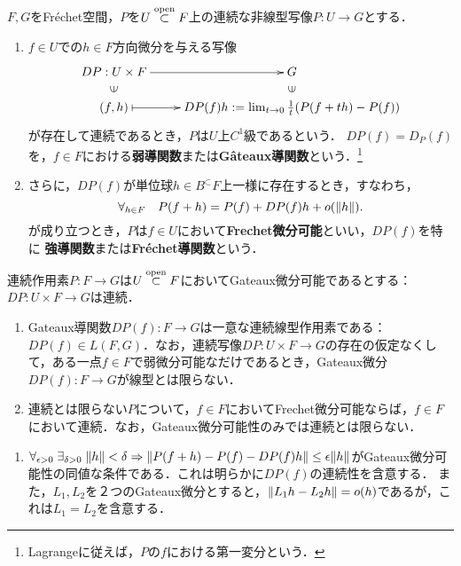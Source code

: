 \documentclass[uplatex,dvipdfmx]{jsreport}
\begin{document}
\begin{definition}
    $F,G$をFréchet空間，$P$を$U\overset{\mathrm{open}}{\subset} F$上の連続な非線型写像$P:U\to G$とする．
    \begin{enumerate}
        \item 
    $f\in U$での$h\in F$方向微分を与える写像
    \[\xymatrix@R-2pc{
        DP:U\times F\ar[r]&G\\
        \rotatebox[origin=c]{90}{$\in$}&\rotatebox[origin=c]{90}{$\in$}\\
        (f,h)\ar@{|->}[r]&DP(f)h:=\lim_{t\to0}\frac{1}{t}(P(f+th)-P(f))
    }\]
    が存在して連続であるとき，$P$は$U$上$C^1$級であるという．
    $DP(f)=D_P(f)$を，$f\in F$における\textbf{弱導関数}または\textbf{Gâteaux導関数}という．\footnote{Lagrangeに従えば，$P$の$f$における第一変分という．}
    \item さらに，$DP(f)$が単位球$h\in B^\subset F$上一様に存在するとき，すなわち，
    \[\forall_{h\in F}\quad P(f+h)=P(f)+DP(f)h+o(\|h\|).\]
    が成り立つとき，$P$は$f\in U$において\textbf{Frechet微分可能}といい，$DP(f)$を特に
    \textbf{強導関数}または\textbf{Fréchet導関数}という．
    \end{enumerate}
\end{definition}

\begin{lemma}
    連続作用素$P:F\to G$は$U\overset{\mathrm{open}}{\subset} F$においてGateaux微分可能であるとする：$DP:U\times F\to G$は連続．
    \begin{enumerate}
        \item Gateaux導関数$DP(f):F\to G$は一意な連続線型作用素である：$DP(f)\in L(F,G)$．なお，連続写像$DP:U\times F\to G$の存在の仮定なくして，ある一点$f\in F$で弱微分可能なだけであるとき，Gateaux微分$DP(f):F\to G$が線型とは限らない．
        \item 連続とは限らない$P$について，$f\in F$においてFrechet微分可能ならば，$f\in F$において連続．なお，Gateaux微分可能性のみでは連続とは限らない．
    \end{enumerate}
\end{lemma}
\begin{Proof}\mbox{}
    \begin{enumerate}
        \item 
        $\forall_{\epsilon>0}\;\exists_{\delta>0}\;\|h\|<\delta\Rightarrow\|P(f+h)-P(f)-DP(f)h\|\le\epsilon\|h\|$がGateaux微分可能性の同値な条件である．これは明らかに$DP(f)$の連続性を含意する．
        また，$L_1,L_2$を２つのGateaux微分とすると，$\|L_1h-L_2h\|=o(h)$であるが，これは$L_1=L_2$を含意する．
    \end{enumerate}
\end{Proof}
\end{document}
